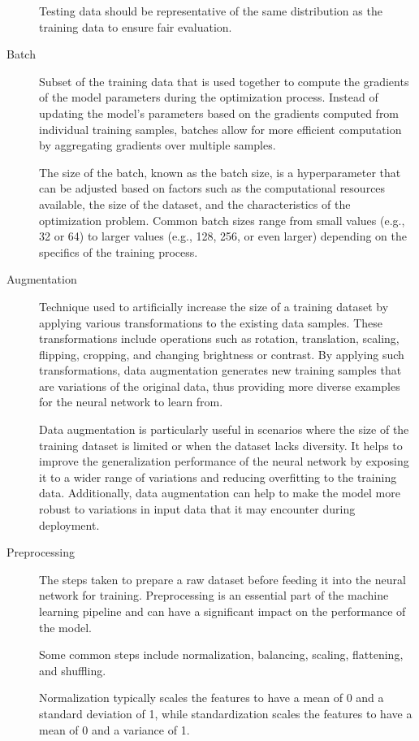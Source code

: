 \documentclass[a4paper]{article}
\begin{document}
\begin{description}
Testing data should be representative of the same distribution as the training data to ensure fair evaluation. 

\item[Batch]
Subset of the training data that is used together to compute the gradients of the model parameters during the optimization process. Instead of updating the model's parameters based on the gradients computed from individual training samples, batches allow for more efficient computation by aggregating gradients over multiple samples.

The size of the batch, known as the batch size, is a hyperparameter that can be adjusted based on factors such as the computational resources available, the size of the dataset, and the characteristics of the optimization problem. Common batch sizes range from small values (e.g., 32 or 64) to larger values (e.g., 128, 256, or even larger) depending on the specifics of the training process.

\item[Augmentation]
Technique used to artificially increase the size of a training dataset by applying various transformations to the existing data samples. These transformations include operations such as rotation, translation, scaling, flipping, cropping, and changing brightness or contrast. By applying such transformations, data augmentation generates new training samples that are variations of the original data, thus providing more diverse examples for the neural network to learn from.

Data augmentation is particularly useful in scenarios where the size of the training dataset is limited or when the dataset lacks diversity. It helps to improve the generalization performance of the neural network by exposing it to a wider range of variations and reducing overfitting to the training data. Additionally, data augmentation can help to make the model more robust to variations in input data that it may encounter during deployment.

\item[Preprocessing]
The steps taken to prepare a raw dataset before feeding it into the neural network for training. Preprocessing is an essential part of the machine learning pipeline and can have a significant impact on the performance of the model. 

Some common steps include normalization, balancing, scaling, flattening, and shuffling.

Normalization typically scales the features to have a mean of 0 and a standard deviation of 1, while standardization scales the features to have a mean of 0 and a variance of 1.


\end{description}
\end{document}
